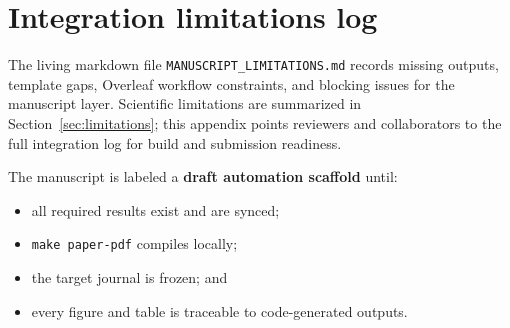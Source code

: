 \section{Integration limitations log}
\label{app:limitations-log}

The living markdown file \texttt{MANUSCRIPT\_LIMITATIONS.md} records missing outputs,
template gaps, Overleaf workflow constraints, and blocking issues for the manuscript layer.
Scientific limitations are summarized in Section~\ref{sec:limitations}; this appendix points
reviewers and collaborators to the full integration log for build and submission readiness.

The manuscript is labeled a \textbf{draft automation scaffold} until:
\begin{itemize}
  \item all required results exist and are synced;
  \item \texttt{make paper-pdf} compiles locally;
  \item the target journal is frozen; and
  \item every figure and table is traceable to code-generated outputs.
\end{itemize}
